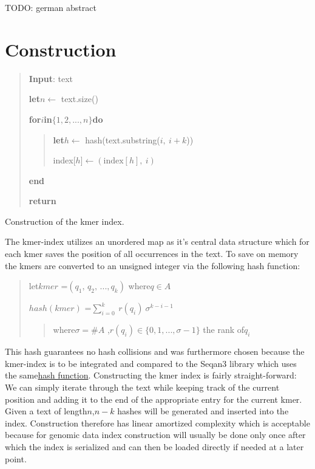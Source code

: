 \begin{abstractDE}
TODO: german abstract
\end{abstractDE}
\vfill

\tableofcontents{}
\setcounter{page}{1}



\chapter{Construction}

\begin{algorithm}[H]
\begin{verse}
\textbf{Input}: text

\textbf{let}$n$$\leftarrow$ text.size()

\textbf{for}$i$\textbf{in}$\{1,2,...,n\}$\textbf{do}
\begin{verse}
\textbf{let}$h$$\leftarrow$ hash(text.substring($i,\:i+k$))

index{[}$h${]}$\leftarrow$$(\text{index}[h],\:i)$
\end{verse}
\textbf{end}

\textbf{return}
\end{verse}
\caption{Construction of the kmer index.}
\end{algorithm}

The kmer-index utilizes an unordered map as it's central data structure
which for each kmer saves the position of all occurrences in the text.
To save on memory the kmers are converted to an unsigned integer via
the following hash function:
\begin{verse}
let$kmer$ =$(q_{1},\,q_{2},\,...,q_{k})$ where$q\in A$

$hash(kmer)$ =$\sum_{i=0}^{k}\:r(q_{i})\:\sigma^{k-i-1}$
\begin{verse}
where$\sigma=\#A$ ,$r(q_{i})\in\{0,1,...,\sigma-1\}$ the rank of$q_{i}$
\end{verse}
\end{verse}
This hash guarantees no hash collisions and was furthermore chosen
because the kmer-index is to be integrated and compared to the Seqan3
library which uses the same\href{http://docs.seqan.de/seqan/3-master-user/group__views.html\#ga6e598d6a021868f704d39df73252974f}{hash function}.
Constructing the kmer index is fairly straight-forward: We can simply
iterate through the text while keeping track of the current position
and adding it to the end of the appropriate entry for the current
kmer. Given a text of length$n$,$n-k$ hashes will be generated and
inserted into the index. Construction therefore has linear amortized
complexity which is acceptable because for genomic data index construction
will usually be done only once after which the index is serialized
and can then be loaded directly if needed at a later point.

